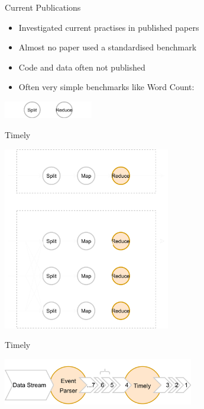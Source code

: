 \documentclass[14pt,t]{beamer}
\renewcommand{\title}[1]{
  {\huge #1} \vskip 0.4cm
}
\begin{document}
\begin{frame}
  \title{Current Publications}
  \begin{itemize}
  \item Investigated current practises in published papers
  \item Almost no paper used a standardised benchmark
  \item Code and data often not published
  \item Often very simple benchmarks like Word Count:
  \end{itemize}
  \vspace{1cm}
  \begin{center}
    \includegraphics[height=0.75cm]{hib-3.png}
  \end{center}
\end{frame}

\begin{frame}
  \title{Timely}
  \begin{center}
    \includegraphics[height=8cm]{dataflow.png}
  \end{center}
\end{frame}

\begin{frame}
  \title{Timely}
  \vspace*{2cm}
  \begin{center}
    \includegraphics[height=2cm]{epochs.png}
  \end{center}
\end{frame}
\end{document}
